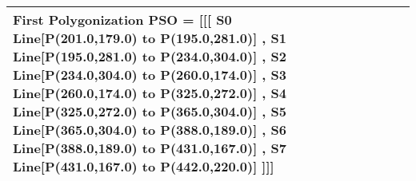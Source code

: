 \begin{landscape}
\begin{scriptsize}
\begin{longtable}{|p{2cm}|p{2cm}|p{2cm}|p{2cm}|p{13cm}|}
 First Polygonization PSO = [[[  S0 Line[P(201.0,179.0) to P(195.0,281.0)]  ,      S1 Line[P(195.0,281.0) to P(234.0,304.0)]  ,      S2 Line[P(234.0,304.0) to P(260.0,174.0)]  ,      S3 Line[P(260.0,174.0) to P(325.0,272.0)]  ,      S4 Line[P(325.0,272.0) to P(365.0,304.0)]  ,      S5 Line[P(365.0,304.0) to P(388.0,189.0)]  ,      S6 Line[P(388.0,189.0) to P(431.0,167.0)]  ,      S7 Line[P(431.0,167.0) to P(442.0,220.0)]  ]]]  
 \\ \hline 
 
 
 
		\end{longtable}


\end{scriptsize}

\end{landscape}

	
	
	
%	
%	
%  
%
